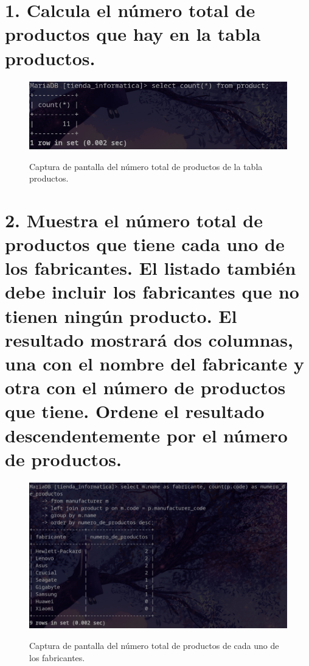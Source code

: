 \documentclass{article}
\begin{document}
\newpage %

\section*{1. Calcula el número total de productos que hay en la tabla productos.}


\begin{figure}[ht]
    \centering
    {
        \includegraphics[width=\linewidth]{01screenshot.png} %
    }
    \caption{Captura de pantalla del número total de productos de la tabla productos.}
\end{figure}

\newpage %

\section*{2. Muestra el número total de productos que tiene cada uno de los fabricantes. 
El listado también debe incluir los fabricantes que no tienen ningún producto. 
El resultado mostrará dos columnas, una con el nombre del fabricante y otra con 
el número de productos que tiene. Ordene el resultado descendentemente por el número de productos.}

\begin{figure}[ht]
    \centering
    {
        \includegraphics[width=\linewidth]{02screenshot.png} %
    }
    \caption{Captura de pantalla del número total de productos de cada uno de los fabricantes.}
\end{figure}
\end{document}
